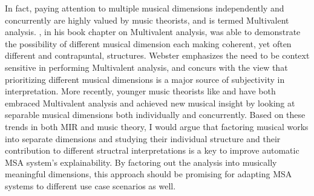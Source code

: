 In fact, paying attention to multiple musical dimensions independently and concurrently are highly valued by music theorists, and is termed Multivalent analysis.
\cite{webster2009multivalent}, in his book chapter on Multivalent analysis, was able to demonstrate the possibility of different musical dimension each making coherent, yet often different and contrapuntal, structures.
Webster emphasizes the need to be context sensitive in performing Multivalent analysis, and concurs with the view that prioritizing different musical dimensions is a major source of subjectivity in interpretation.
More recently, younger music theorists like \cite{brody2016parametric} and \cite{yust2018organized} have both embraced Multivalent analysis and achieved new musical insight by looking at separable musical dimensions both individually and concurrently.
Based on these trends in both MIR and music theory, I would argue that factoring musical works into separate dimensions and studying their individual structure and their contribution to different structral interpretations is a key to improve automatic MSA system's explainability.
By factoring out the analysis into musically meaningful dimensions, this approach should be promising for adapting MSA systems to different use case scenarios as well.

